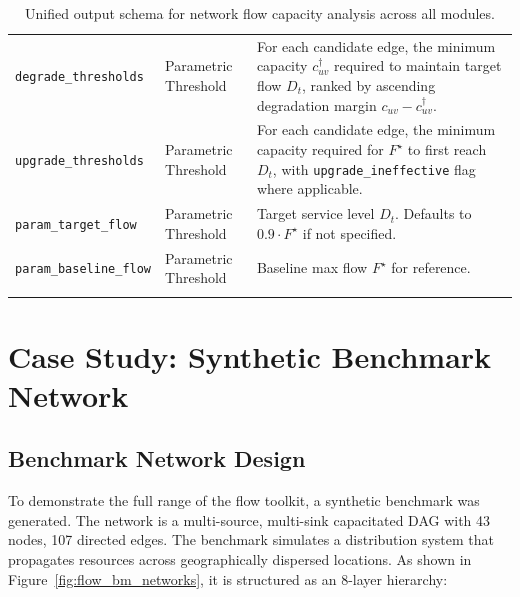 \documentclass[12pt]{report}
\begin{document}
\begin{longtable}{>{\raggedright\arraybackslash}p{4cm} >{\raggedright\arraybackslash}p{2.5cm} p{7.5cm}}
\midrule
\texttt{degrade\_thresholds} & Parametric Threshold & For each candidate edge, the minimum capacity $c^\dagger_{uv}$ required to maintain target flow $D_t$, ranked by ascending degradation margin $c_{uv} - c^\dagger_{uv}$. \\[2pt]
\texttt{upgrade\_thresholds} & Parametric Threshold & For each candidate edge, the minimum capacity required for $F^\star$ to first reach $D_t$, with \texttt{upgrade\_ineffective} flag where applicable. \\[2pt]
\texttt{param\_target\_flow} & Parametric Threshold & Target service level $D_t$. Defaults to $0.9 \cdot F^\star$ if not specified. \\[2pt]
\texttt{param\_baseline\_flow} & Parametric Threshold & Baseline max flow $F^\star$ for reference. \\
\caption{Unified output schema for network flow capacity analysis across all modules.}
\label{tab:flowsolveresult}
\end{longtable}

\clearpage

\section{Case Study: Synthetic Benchmark Network}

\subsection{Benchmark Network Design}
To demonstrate the full range of the flow toolkit, a synthetic benchmark was generated. The network is a multi-source, multi-sink capacitated DAG with 43 nodes, 107 directed edges. The benchmark simulates a distribution system that propagates resources across geographically dispersed locations. As shown in Figure~\ref{fig:flow_bm_networks}, it is structured as an 8-layer hierarchy:
\end{document}
